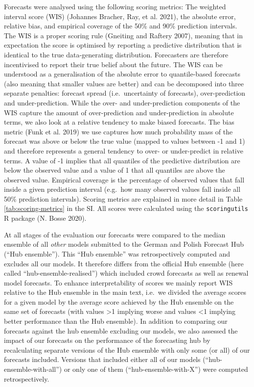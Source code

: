 \documentclass[
]{article}
\begin{document}
Forecasts were analysed using the following scoring metrics: The weighted interval score (WIS) (Johannes Bracher, Ray, et al. 2021), the absolute error, relative bias, and empirical coverage of the 50\% and 90\% prediction intervals. The WIS is a proper scoring rule (Gneiting and Raftery 2007), meaning that in expectation the score is optimised by reporting a predictive distribution that is identical to the true data-generating distribution. Forecasters are therefore incentivised to report their true belief about the future. The WIS can be understood as a generalisation of the absolute error to quantile-based forecasts (also meaning that smaller values are better) and can be decomposed into three separate penalties: forecast spread (i.e.~uncertainty of forecasts), over-prediction and under-prediction. While the over- and under-prediction components of the WIS capture the amount of over-prediction and under-prediction in absolute terms, we also look at a relative tendency to make biased forecasts. The bias metric (Funk et al. 2019) we use captures how much probability mass of the forecast was above or below the true value (mapped to values between -1 and 1) and therefore represents a general tendency to over- or under-predict in relative terms. A value of -1 implies that all quantiles of the predictive distribution are below the observed value and a value of 1 that all quantiles are above the observed value. Empirical coverage is the percentage of observed values that fall inside a given prediction interval (e.g.~how many observed values fall inside all 50\% prediction intervals). Scoring metrics are explained in more detail in Table \ref{tab:scoring-metrics} in the SI. All scores were calculated using the \texttt{scoringutils} R package (N. Bosse 2020).

At all stages of the evaluation our forecasts were compared to the median ensemble of all \emph{other} models submitted to the German and Polish Forecast Hub (``Hub ensemble''). This ``Hub ensemble'' was retrospectively computed and excludes all our models. It therefore differs from the official Hub ensemble (here called ``hub-ensemble-realised'') which included crowd forecasts as well as renewal model forecasts. To enhance interpretability of scores we mainly report WIS relative to the Hub ensemble in the main text, i.e.~we divided the average scores for a given model by the average score achieved by the Hub ensemble on the same set of forecasts (with values \textgreater1 implying worse and values \textless1 implying better performance than the Hub ensemble). In addition to comparing our forecasts against the hub ensemble excluding our models, we also assessed the impact of our forecasts on the performance of the forecasting hub by recalculating separate versions of the Hub ensemble with only some (or all) of our forecasts included. Versions that included either all of our models (``hub-ensemble-with-all'') or only one of them (``hub-ensemble-with-X'') were computed retrospectively.
\end{document}
